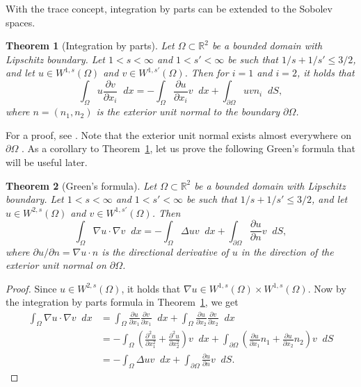 \documentclass[english, 12pt, a4paper, sci, utf8, a-2b, online]{aaltothesis}
\theoremstyle{definition}
\theoremstyle{plain}
\newtheorem{theorem}{Theorem}[section]
\newcommand*\diff{\mathop{}\!d}
\numberwithin{equation}{section}
\begin{document}
With the trace concept, integration by parts can be extended to the Sobolev spaces.
\begin{theorem}[Integration by parts]
    \label{thm:integrationbyparts}
    Let $\Omega \subset \mathbb{R}^2$ be a bounded domain with Lipschitz
    boundary. Let $1 < s < \infty$ and $1 < s' < \infty$ be such that
    $1/s + 1/s' \leq 3/2$, and let $u \in W^{1,s}(\Omega)$
    and $v \in W^{1,s'}(\Omega)$. Then for $i=1$ and $i=2$, it holds that
    \begin{equation*}
        \int_{\Omega} u \frac{\partial v}{\partial x_i} \diff x
        = - \int_{\Omega} \frac{\partial u}{\partial x_i} v \diff x
            + \int_{\partial \Omega} uv n_i \diff S,
    \end{equation*}
    where $n = (n_1, n_2)$ is the exterior unit normal
    to the boundary $\partial \Omega$.
\end{theorem}
For a proof, see \cite[Theorem~1.1 on p.~117]{necas2011}.
Note that the exterior unit normal exists almost everywhere on $\partial \Omega$
\cite[Lemma~4.2 on p.~83]{necas2011}.
As a corollary to Theorem~\ref{thm:integrationbyparts},
let us prove the following Green's formula that will be useful later.
\begin{theorem}[Green's formula]
    \label{thm:greensformula}
    Let $\Omega \subset \mathbb{R}^2$ be a bounded domain with Lipschitz
    boundary. Let $1 < s < \infty$ and $1 < s' < \infty$ be such that
    $1/s + 1/s' \leq 3/2$, and let $u \in W^{2,s}(\Omega)$
    and $v \in W^{1,s'}(\Omega)$. Then
    \begin{equation*}
        \int_{\Omega} \nabla u \cdot \nabla v \diff x
        = -\int_{\Omega} \Delta u v \diff x
            + \int_{\partial \Omega} \frac{\partial u}{\partial n} v \diff S,
    \end{equation*}
    where $\partial u / \partial n = \nabla u \cdot n$ is the directional
    derivative of $u$ in the direction of the exterior
    unit normal on $\partial \Omega$.
\end{theorem}
\begin{proof}
    Since $u \in W^{2,s}(\Omega)$, it holds that
    $\nabla u \in W^{1,s}(\Omega) \times W^{1,s}(\Omega)$.
    Now by the integration by parts formula in
    Theorem~\ref{thm:integrationbyparts}, we get
    \begin{align*}
        \int_{\Omega} \nabla u \cdot \nabla v \diff x
        &= \int_{\Omega} \frac{\partial u}{\partial x_1}
            \frac{\partial v}{\partial x_1} \diff x
            + \int_{\Omega} \frac{\partial u}{\partial x_2}
            \frac{\partial v}{\partial x_2} \diff x \\
        &= -\int_{\Omega} \left( 
            \frac{\partial^2 u}{\partial x_1^2}
                + \frac{\partial^2 u}{\partial x_2^2} \right) v \diff x
            + \int_{\partial \Omega} \left(
                \frac{\partial u}{\partial x_1} n_1
                    + \frac{\partial u}{\partial x_2} n_2 \right) v \diff S \\
        &= -\int_{\Omega} \Delta u v \diff x
            + \int_{\partial \Omega} \frac{\partial u}{\partial n} v \diff S.
    \end{align*}
\end{proof}
\end{document}
